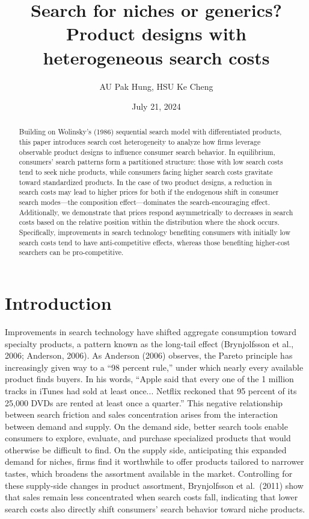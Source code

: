 \documentclass[14pt]{article}
\title{Search for niches or generics? \\Product designs with heterogeneous search costs}
\author{AU Pak Hung, HSU Ke Cheng}
\date{July 21, 2024}
\theoremstyle{plain}
\theoremstyle{definition}
\theoremstyle{remark}
\DeclareRobustCommand\1{\futurelet\oneNext\oneCheck}
\begin{document}
\begin{titlingpage}
    \maketitle
    \begin{abstract}
           Building on Wolinsky's (1986) sequential search model with differentiated products, this paper introduces search cost heterogeneity to analyze how firms leverage observable product designs to influence consumer search behavior. In equilibrium, consumers’ search patterns form a partitioned structure: those with low search costs tend to seek niche products, while consumers facing higher search costs gravitate toward standardized products. In the case of two product designs, a reduction in search costs may lead to higher prices for both if the endogenous shift in consumer search modes—the composition effect—dominates the search-encouraging effect. Additionally, we demonstrate that prices respond asymmetrically to decreases in search costs based on the relative position within the distribution where the shock occurs. Specifically, improvements in search technology benefiting consumers with initially low search costs tend to have anti-competitive effects, whereas those benefiting higher-cost searchers can be pro-competitive. 
    \end{abstract}
\end{titlingpage}
\section{Introduction}
Improvements in search technology have shifted aggregate consumption toward specialty products, a pattern known as the long-tail effect (Brynjolfsson et al., 2006; Anderson, 2006). As Anderson (2006) observes, the Pareto principle has increasingly given way to a ``98 percent rule,'' under which nearly every available product finds buyers. In his words, ``Apple said that every one of the 1 million tracks in iTunes had sold at least once... Netflix reckoned that 95 percent of its 25,000 DVDs are rented at least once a quarter.'' This negative relationship between search friction and sales concentration arises from the interaction between demand and supply. On the demand side, better search tools enable consumers to explore, evaluate, and purchase specialized products that would otherwise be difficult to find. On the supply side, anticipating this expanded demand for niches, firms find it worthwhile to offer products tailored to narrower tastes, which broadens the assortment available in the market. Controlling for these supply-side changes in product assortment, Brynjolfsson et al.\ (2011) show that sales remain less concentrated when search costs fall, indicating that lower search costs also directly shift consumers' search behavior toward niche products.
\end{document}
